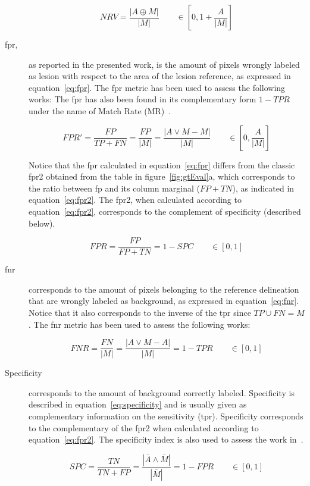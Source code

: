 \documentclass[authoryear,preprint,review,12pt]{elsarticle}
\begin{document}
\begin{description}
\begin{equation}\label{eq:nrv}
NRV = \frac{|A \oplus M|}{|M|} \qquad \in \left[0, 1+\frac{A}{|M|}\right]
\end{equation}


\item[\acf{fpr},]
as reported in the presented work, is the amount of pixels wrongly labeled as lesion with respect to the area of the lesion reference, as expressed in equation~\ref{eq:fpr}. The \ac{fpr} metric has been used to assess the following works:\cite{Madabhushi:2003p6036,Shan:2012p14347,Huang:2012p14313,Liu:2010p14328,Yeh:2009p11985} The \ac{fpr} has also been found in its complementary form $1-TPR$ under the name of Match Rate (MR)~\cite{Huang:2004p2092}.

\begin{equation}\label{eq:fpr}
FPR'= \frac{FP}{TP + FN} = \frac{FP}{|M|}=\frac{|A \vee M - M|}{|M|} \qquad \in \left[0,\frac{A}{|M|}\right]
\end{equation}

Notice that the \ac{fpr} calculated in equation~\ref{eq:fpr} differs from the classic \ac{fpr2} obtained from the table in figure~\ref{fig:gtEval}a, which corresponds to the ratio between \ac{fp} and its column marginal ($FP+TN$), as indicated in equation~\ref{eq:fpr2}. The \ac{fpr2}, when calculated according to equation~\ref{eq:fpr2}, corresponds to the complement of specificity (described below).

\begin{equation}\label{eq:fpr2}
FPR= \frac{FP}{FP + TN} = 1-SPC \qquad \in [0,1]
\end{equation}

\item[\acf{fnr}]
corresponds to the amount of pixels belonging to the reference delineation that are wrongly labeled as background, as expressed in equation~\ref{eq:fnr}. Notice that it also corresponds to the inverse of the \ac{tpr} since $TP \cup FN = M$.
The \ac{fnr} metric has been used to assess the following works:
\cite{Madabhushi:2003p6036,Huang:2012p14313,Yeh:2009p11985}

\begin{equation}\label{eq:fnr}
FNR = \frac{FN}{|M|}=\frac{|A \vee M - A|}{|M|}=1-TPR \qquad \in [0,1]
\end{equation}

\item[Specificity] corresponds to the amount of background correctly labeled. Specificity is described in equation~\ref{eq:specificity} and is usually given as complementary information on the sensitivity (\ac{tpr}). Specificity corresponds to the complementary of the \ac{fpr2} when calculated according to equation~\ref{eq:fpr2}. The specificity index is also used to assess the work in~\cite{gerard2013,Jiang:2012p14354}.

\begin{equation}\label{eq:specificity}
SPC = \frac{TN}{TN+FP} = \frac{|\overline A \wedge \overline M|}{|\overline M|}=1-FPR \qquad \in [0,1]
\end{equation}
\end{description}
\end{document}
